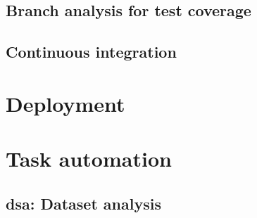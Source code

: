 \cite{woodward1980experience, gupta2000generating}

\subsection{Branch analysis for test coverage}



\subsection{Continuous integration}



\section{Deployment}


\cite{fowler2006continuous, duvall2007continuous}



\section{Task automation}\label{sec:task-automation}



\subsection{dsa: Dataset analysis}



